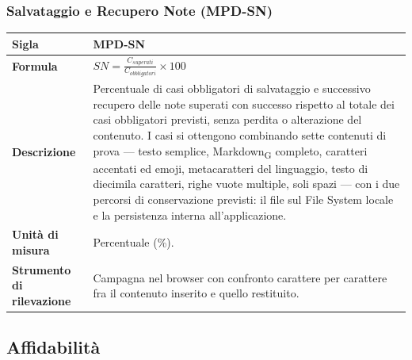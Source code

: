 \documentclass[a4paper, 10pt]{article}
\begin{document}
\subsubsection{Salvataggio e Recupero Note (MPD-SN)}
\noindent
\begin{minipage}{\textwidth}
    \begin{tabularx}{\textwidth}{|>{\columncolor{bluBitless!10}\bfseries}p{3.5cm}|X|}
        \hline
        Sigla & MPD-SN \\ \hline
        Formula &
        \textit{$SN = \frac{C_{superati}}{C_{obbligatori}} \times 100$} \\ \hline
        Descrizione & Percentuale di casi obbligatori di salvataggio e successivo recupero delle note superati con successo rispetto al totale dei casi obbligatori previsti, senza perdita o alterazione del contenuto. I casi si ottengono combinando sette contenuti di prova --- testo semplice, Markdown\textsubscript{G} completo, caratteri accentati ed emoji, metacaratteri del linguaggio, testo di diecimila caratteri, righe vuote multiple, soli spazi --- con i due percorsi di conservazione previsti: il file sul File System locale e la persistenza interna all'applicazione. \\ \hline
        Unità di misura & Percentuale (\%). \\ \hline
        Strumento di rilevazione & Campagna nel browser con confronto carattere per carattere fra il contenuto inserito e quello restituito. \\ \hline
    \end{tabularx}
\end{minipage}

\vspace{0.8cm}

\subsection{Affidabilità}
\end{document}
